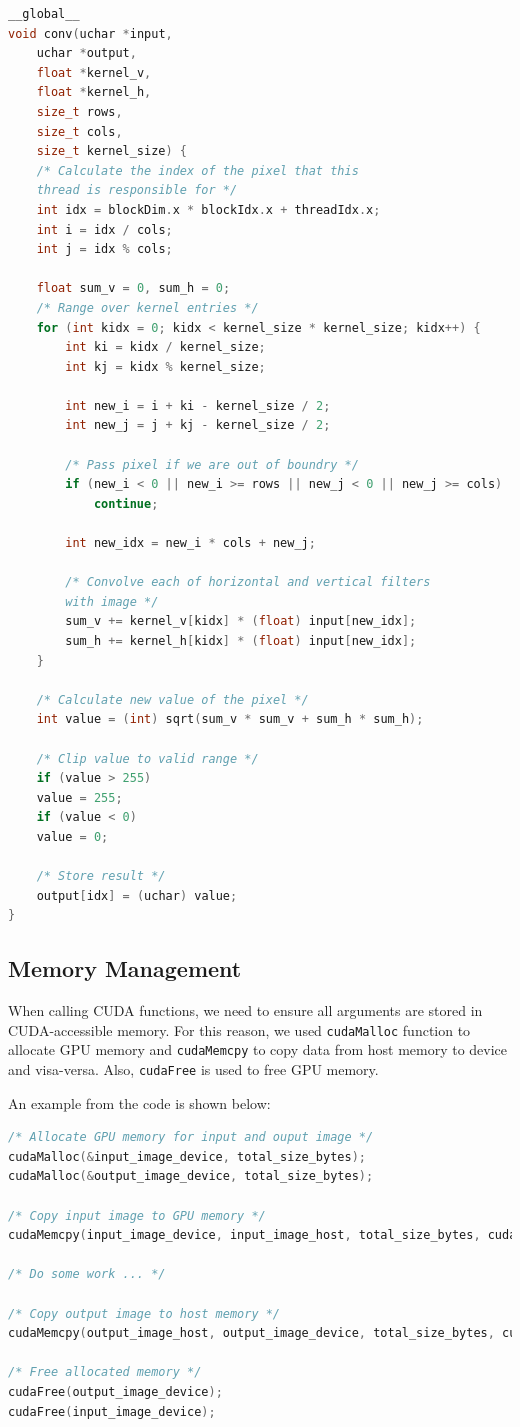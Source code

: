 \documentclass[12pt]{article}
\begin{document}
\begin{lstlisting}[language=c++]
__global__
void conv(uchar *input,
	uchar *output,
	float *kernel_v,
	float *kernel_h,
	size_t rows,
	size_t cols,
	size_t kernel_size) {
	/* Calculate the index of the pixel that this 
	thread is responsible for */
	int idx = blockDim.x * blockIdx.x + threadIdx.x;
	int i = idx / cols;
	int j = idx % cols;
	
	float sum_v = 0, sum_h = 0;
	/* Range over kernel entries */
	for (int kidx = 0; kidx < kernel_size * kernel_size; kidx++) {
		int ki = kidx / kernel_size;
		int kj = kidx % kernel_size;
		
		int new_i = i + ki - kernel_size / 2;
		int new_j = j + kj - kernel_size / 2;
		
		/* Pass pixel if we are out of boundry */
		if (new_i < 0 || new_i >= rows || new_j < 0 || new_j >= cols)
			continue;
		
		int new_idx = new_i * cols + new_j;

		/* Convolve each of horizontal and vertical filters
		with image */		
		sum_v += kernel_v[kidx] * (float) input[new_idx];
		sum_h += kernel_h[kidx] * (float) input[new_idx];
	}
	
	/* Calculate new value of the pixel */
	int value = (int) sqrt(sum_v * sum_v + sum_h * sum_h);

	/* Clip value to valid range */
	if (value > 255)
	value = 255;
	if (value < 0)
	value = 0;
	
	/* Store result */
	output[idx] = (uchar) value;
}
\end{lstlisting}


\subsection{Memory Management}

When calling CUDA functions, we need to ensure all arguments are stored in CUDA-accessible memory. For this reason, we used \verb+cudaMalloc+ function to allocate GPU memory and \verb+cudaMemcpy+ to copy data from host memory to device and visa-versa. Also, \verb+cudaFree+ is used to free GPU memory.

An example from the code is shown below:

\begin{lstlisting}[language=c++]
/* Allocate GPU memory for input and ouput image */
cudaMalloc(&input_image_device, total_size_bytes);
cudaMalloc(&output_image_device, total_size_bytes);

/* Copy input image to GPU memory */
cudaMemcpy(input_image_device, input_image_host, total_size_bytes, cudaMemcpyHostToDevice);

/* Do some work ... */

/* Copy output image to host memory */
cudaMemcpy(output_image_host, output_image_device, total_size_bytes, cudaMemcpyDeviceToHost);

/* Free allocated memory */
cudaFree(output_image_device);
cudaFree(input_image_device);
\end{lstlisting}
\end{document}
